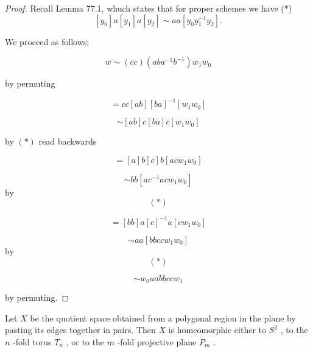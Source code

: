 \begin{proof}Recall Lemma 77.1, whuch states that for proper schemes we have
(*)
\[
\left\lbrack  {y}_{0}\right\rbrack  a\left\lbrack  {y}_{1}\right\rbrack  a\left\lbrack  {y}_{2}\right\rbrack \sim  {aa}\left\lbrack  {{y}_{0}{y}_{1}^{-1}{y}_{2}}\right\rbrack  .
\]

We proceed as follows:

\[
w \sim  \left( {cc}\right) \left( {{ab}{a}^{-1}{b}^{-1}}\right) {w}_{1}{w}_{0}
\]

by permuting

\[
= {cc}\left\lbrack  {ab}\right\rbrack  {\left\lbrack  ba\right\rbrack  }^{-1}\left\lbrack  {{w}_{1}{w}_{0}}\right\rbrack
\]

\[
\sim  \left\lbrack  {ab}\right\rbrack  c\left\lbrack  {ba}\right\rbrack  c\left\lbrack  {{w}_{1}{w}_{0}}\right\rbrack
\]

by \(\left( *\right)\) read backwards

\[
= \left\lbrack  a\right\rbrack  b\left\lbrack  c\right\rbrack  b\left\lbrack  {{ac}{w}_{1}{w}_{0}}\right\rbrack
\]

\[
\sim  {bb}\left\lbrack  {a{c}^{-1}{ac}{w}_{1}{w}_{0}}\right\rbrack
\]
 by
\[
\left( *\right)
\]

\[
= \left\lbrack  {bb}\right\rbrack  a{\left\lbrack  c\right\rbrack  }^{-1}a\left\lbrack  {c{w}_{1}{w}_{0}}\right\rbrack
\]

\[
\sim  {aa}\left\lbrack  {{bbcc}{w}_{1}{w}_{0}}\right\rbrack
\]
 by
\[
\left( *\right)
\]

\[
\sim  {w}_{0}{aabbcc}{w}_{1}
\]

by permuting.
\end{proof}

\begin{theorem} Let \(X\) be the quotient space obtained from a polygonal region in the plane by pasting its edges together in pairs. Then \(X\) is homeomorphic either to \({S}^{2}\) , to the \(n\) -fold torus \({T}_{n}\) , or to the \(m\) -fold projective plane \({P}_{m}\) .
\end{theorem}

